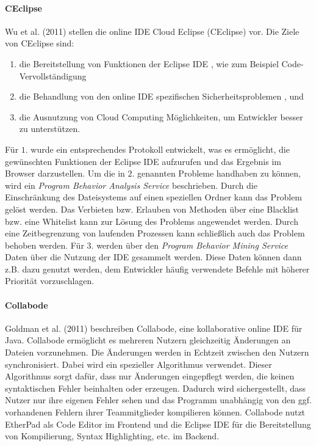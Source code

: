 \paragraph{CEclipse}
Wu et al. (2011) \cite{wu_ceclipse_2011} stellen die online IDE Cloud Eclipse (CEclipse) vor. Die Ziele von CEclipse sind:
\begin{enumerate}
    \item die Bereitstellung von Funktionen der Eclipse IDE \cite{noauthor_eclipse_nodate}, wie zum Beispiel Code-Vervollständigung
    \item die Behandlung von den online IDE spezifischen Sicherheitsproblemen ,  und 
    \item die Ausnutzung von Cloud Computing Möglichkeiten, um Entwickler besser zu unterstützen.
\end{enumerate}
Für $1.$ wurde ein entsprechendes Protokoll entwickelt, was es ermöglicht, die gewünschten Funktionen der Eclipse IDE aufzurufen und das Ergebnis im Browser darzustellen. Um die in $2.$ genannten Probleme handhaben zu können, wird ein \textit{Program Behavior Analysis Service} beschrieben. Durch die Einschränkung des Dateisystems auf einen speziellen Ordner kann das Problem  gelöst werden. Das Verbieten bzw. Erlauben von Methoden über eine Blacklist bzw. eine Whitelist kann zur Lösung des Problems  angewendet werden. Durch eine Zeitbegrenzung von laufenden Prozessen kann schließlich auch das Problem  behoben werden. Für $3.$ werden über den \textit{Program Behavior Mining Service} Daten über die Nutzung der IDE gesammelt werden. Diese Daten können dann z.B. dazu genutzt werden, dem Entwickler häufig verwendete Befehle mit höherer Priorität vorzuschlagen.

\paragraph{Collabode}
Goldman et al. (2011) \cite{goldman_real-time_2011} beschreiben Collabode, eine kollaborative online IDE für Java. Collabode ermöglicht es mehreren Nutzern gleichzeitig Änderungen an Dateien vorzunehmen. Die Änderungen werden in Echtzeit zwischen den Nutzern synchronisiert. Dabei wird ein spezieller Algorithmus verwendet. Dieser Algorithmus sorgt dafür, dass nur Änderungen eingepflegt werden, die keinen syntaktischen Fehler beinhalten oder erzeugen. Dadurch wird sichergestellt, dass Nutzer nur ihre eigenen Fehler sehen und das Programm unabhängig von den ggf. vorhandenen Fehlern ihrer Teammitglieder kompilieren können. Collabode nutzt EtherPad \cite{noauthor_etherpad_nodate} als Code Editor im Frontend und die Eclipse IDE \cite{noauthor_eclipse_nodate} für die Bereitstellung von Kompilierung, Syntax Highlighting, etc. im Backend.

